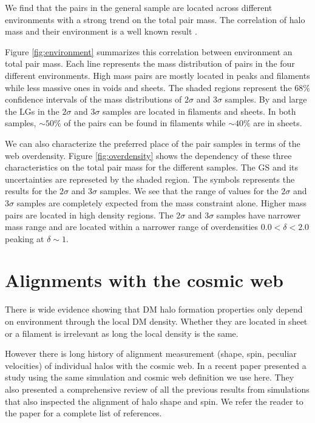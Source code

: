 \documentclass{iau}
\begin{document}
We find that the pairs in the general sample are located across
different environments with a strong trend on the total pair
mass. The correlation of halo mass and their environment is a
well known result \cite{1998ApJ...500...14L}.



Figure \ref{fig:environment} summarizes this correlation between
environment an total pair mass. Each line represents the mass
distribution of pairs in the four different environments. High mass
pairs are mostly located in peaks and filaments while less massive
ones in voids and sheets.  The shaded regions represent the $68\%$
confidence intervals of the mass distributions of $2\sigma$ and
$3\sigma$ samples. By and large the LGs in the $2\sigma$ and $3\sigma$ samples are
located in filaments and sheets. In both samples, $\sim 50\%$ of the
pairs can be found in filaments while $\sim 40\%$ are in sheets. 

We can also characterize the preferred place of the pair samples in terms of the
web overdensity.  Figure \ref{fig:overdensity} shows the dependency of these three
characteristics on the total pair mass for the different samples. The
GS and its uncertainties are represeted by the shaded region. The
symbols represents the results for the $2\sigma$ and $3\sigma$ samples.   
We see that the range of values for the $2\sigma$ and $3\sigma$
samples are completely expected from the mass constraint alone. Higher
mass pairs are located in high density regions. The $2\sigma$ and
$3\sigma$ samples have narrower mass range and are located within a
narrower range of overdensities $0.0<\delta<2.0$ peaking at $\delta \sim 1$. 






\section{Alignments with the cosmic web}

There is wide evidence showing that DM halo formation properties only
depend on environment through the local DM density. Whether they are
located in sheet or a filament is irrelevant as long the local density
is the same. 

However there is long history of alignment measurement (shape, spin,
peculiar velocities) of individual halos with the cosmic web. In a
recent paper \cite{ForeroRomero2014} presented a study
using the same simulation and cosmic web definition we use here.
They also presented a comprehensive review of all the previous results
from simulations that also inspected the alignment of halo shape and
spin. We refer the reader to the paper for a complete list of
references. 
\end{document}
